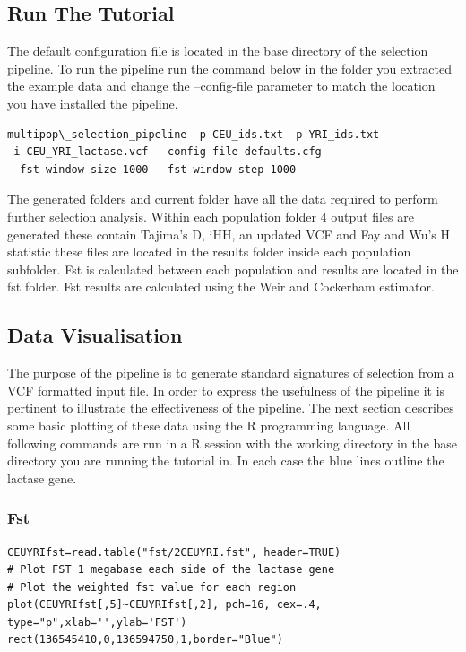 \documentclass[a4paper,10pt]{article}
\begin{document}
\subsection{Run The Tutorial}
The default configuration file is located in the base directory of the selection pipeline. To run the pipeline run the command below in the folder you extracted the example data and change the --config-file parameter to match the location you have installed the pipeline.\\
\begin{verbatim}
multipop\_selection_pipeline -p CEU_ids.txt -p YRI_ids.txt 
-i CEU_YRI_lactase.vcf --config-file defaults.cfg
--fst-window-size 1000 --fst-window-step 1000
\end{verbatim}
The generated folders and current folder have all the data required to perform further selection analysis. Within each population folder 4 output files are generated these contain Tajima's D, iHH, an updated VCF and Fay and Wu's H statistic these files are located in the results folder inside each population subfolder. Fst is calculated between each population and results are located in the fst folder. Fst results are calculated using the Weir and Cockerham estimator.
\subsection{Data Visualisation}
The purpose of the pipeline is to generate standard signatures of selection from a VCF formatted input file. In order to express the usefulness of the pipeline it is pertinent to illustrate the effectiveness of the pipeline. The next section describes some basic plotting of these data using the R programming language. All following commands are run in a R session with the working directory in the base directory you are running the tutorial in. In each case the blue lines outline the lactase gene.
\subsubsection{Fst}


\begin{verbatim}
CEUYRIfst=read.table("fst/2CEUYRI.fst", header=TRUE)
# Plot FST 1 megabase each side of the lactase gene
# Plot the weighted fst value for each region
plot(CEUYRIfst[,5]~CEUYRIfst[,2], pch=16, cex=.4, type="p",xlab='',ylab='FST') 
rect(136545410,0,136594750,1,border="Blue") 
\end{verbatim}
\end{document}
